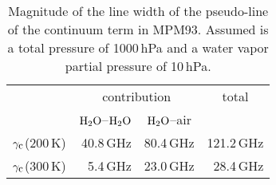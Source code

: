 {\begin{table}[!htb]
\begin{center}
\begin{tabular}{lrrr}
\hline
 & \multicolumn{2}{c}{contribution} & \multicolumn{1}{c}{total} \\
 & \multicolumn{1}{c}{$\mbox{H}_2\mbox{O}$--$\mbox{H}_2\mbox{O}$} & \multicolumn{1}{c}{$\mbox{H}_2\mbox{O}$--air} & \\
\hline
$\gamma_{\mbox{\rm \small c}}$(200\,K) & 40.8\,GHz & 80.4\,GHz & 121.2\,GHz\\
$\gamma_{\mbox{\rm \small c}}$(300\,K) &  5.4\,GHz & 23.0\,GHz &  28.4\,GHz\\
\hline
\end{tabular}
\caption{Magnitude of the line width of the pseudo-line of the
  continuum term in MPM93. Assumed is a total pressure of 1000\,hPa
  and a water vapor partial pressure of 10\,hPa.}
\label{tab:mpm_psl_broad}
\end{center}
\end{table} 

}
